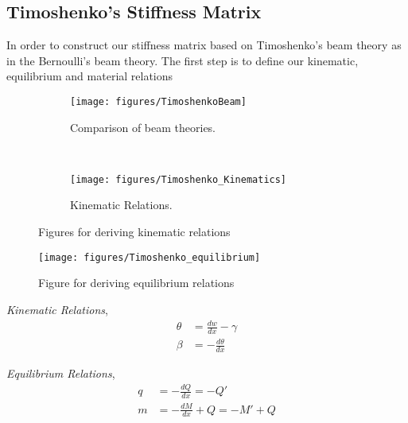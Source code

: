 \documentclass[10pt,twoside,a4paper]{article}
\begin{document}
\subsection{Timoshenko's Stiffness Matrix}

In order to construct our stiffness matrix based on Timoshenko's beam theory as in the Bernoulli's beam theory. The first step is to define our kinematic, equilibrium and material relations

\begin{figure}
        \centering
        \begin{subfigure}[b]{0.48\textwidth}
                \centering
                \texttt{[image: figures/TimoshenkoBeam]}
                \caption{Comparison of beam theories.}
                \label{fig:Beam_comparison}
        \end{subfigure}%
        ~ %
        \begin{subfigure}[b]{0.48\textwidth}
                \centering
                \texttt{[image: figures/Timoshenko\_Kinematics]}
                \caption{Kinematic Relations.}
                \label{fig:Beam_kinematics}
        \end{subfigure}
        \caption{Figures for deriving kinematic relations}
	\label{fig:Timoshenko_kinematics}
\end{figure}

\begin{figure}
        \centering
        \texttt{[image: figures/Timoshenko\_equilibrium]}
        \caption{Figure for deriving equilibrium relations}
	\label{fig:Timoshenko_equilibrium}
\end{figure}

\emph{Kinematic Relations},
\begin{subequations}
	\begin{align}
	\theta &= \frac{dw}{dx}-\gamma \\
	\beta &= -\frac{d\theta}{dx}
	\end{align}
\end{subequations}

\emph{Equilibrium Relations},
\begin{subequations}
	\begin{align}
	q &= -\frac{dQ}{dx} = -Q' \\
	m &= -\frac{dM}{dx} + Q = -M' + Q
	\end{align}
\end{subequations}
\end{document}
